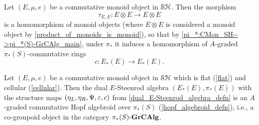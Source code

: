 \documentclass[../main.tex]{subfiles}
\begin{document}
\begin{proposition}\label{(E,mu,e):c}
    Let $(E,\mu,e)$ be a commutative monoid object in $\mathcal{SH}$. Then the morphism
    \[\tau_{E,E}:E\otimes E\to E\otimes E\]
    is a homomorphism of monoid objects (where $E\otimes E$ is considered a monoid object by \autoref{product_of_monoids_is_monoid}), so that by \autoref{pi_*:CMon_SH-->pi_*(S)-GrCAlg_main}, under $\pi_*$ it induces a homomorphism of $A$-graded $\pi_*(S)$-commutative rings
    \[c:E_*(E)\to E_*(E).\]
\end{proposition}

\begin{proposition}\label{dual_E-Steenrod_algebra_is_a_Hopf_algebroid_main}
    Let $(E,\mu,e)$ be a commutative monoid object in $\mathcal{SH}$ which is flat (\autoref{flat}) and cellular (\autoref{cellular}). Then the dual $E$-Steenrod algebra $(E_*(E),\pi_*(E))$ with the structure maps $(\eta_L,\eta_R,\Psi,\varepsilon,c)$ from \autoref{dual_E-Steenrod_algebra_defn} is an $A$-graded commutative Hopf algebroid over $\pi_*(S)$ (\autoref{hopf_algebroid_defn}), i.e., a co-groupoid object in the category ${\pi_*(S)}\text-\mathbf{GrCAlg}$.
\end{proposition}
\end{document}
